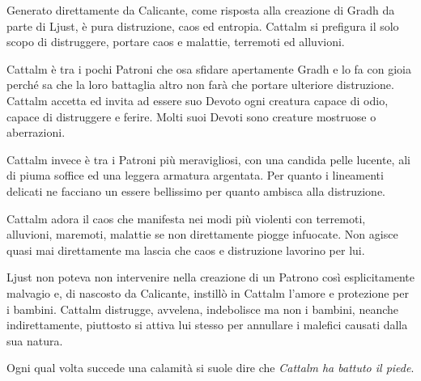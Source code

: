 \begin{multicols}{2}
Generato direttamente da Calicante, come risposta alla creazione di Gradh da parte di Ljust, è pura distruzione, caos ed entropia. Cattalm si prefigura il solo scopo di distruggere, portare caos e malattie, terremoti ed alluvioni.

Cattalm è tra i pochi Patroni che osa sfidare apertamente Gradh e lo fa con gioia perché sa che la loro battaglia altro non farà che portare ulteriore distruzione. Cattalm accetta ed invita ad essere suo Devoto ogni creatura capace di odio, capace di distruggere e ferire. Molti suoi Devoti sono creature mostruose o aberrazioni.

Cattalm invece è tra i Patroni più meravigliosi, con una candida pelle lucente, ali di piuma soffice ed una leggera armatura argentata. Per quanto i lineamenti delicati ne facciano un essere bellissimo per quanto ambisca alla distruzione.

Cattalm adora il caos che manifesta nei modi più violenti con terremoti, alluvioni, maremoti, malattie se non direttamente piogge infuocate. Non agisce quasi mai direttamente ma lascia che caos e distruzione lavorino per lui.

Ljust non poteva non intervenire nella creazione di un Patrono così esplicitamente malvagio e, di nascosto da Calicante, instillò in Cattalm l'amore e protezione per i bambini. Cattalm distrugge, avvelena, indebolisce ma non i bambini, neanche indirettamente, piuttosto si attiva lui stesso per annullare i malefici causati dalla sua natura.

Ogni qual volta succede una calamità si suole dire che \emph{Cattalm ha battuto il piede}.


\end{multicols}
